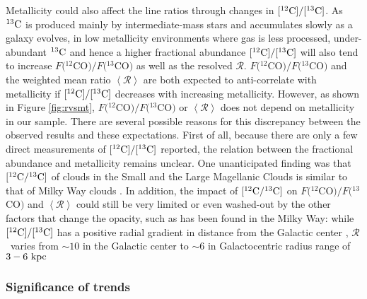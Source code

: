 \documentclass{emulateapj}
\def\ttco{\mbox{$^{13}$CO}}
\def\twco{\mbox{$^{12}$CO}}
\def\rtt{$\mathcal{R}$}
\begin{document}
Metallicity could also affect the line ratios through changes in $[^{12}\rm C]/[^{13}\rm C]$. 
As $^{13}\rm C$ is produced mainly by intermediate-mass stars 
and  accumulates slowly as a galaxy evolves, 
in low metallicity environments where gas is less processed,     
under-abundant $^{13}\rm C$ and hence a higher fractional abundance
$[^{12}\rm C]/[^{13}\rm C]$ will also tend to increase $F($\twco$)/F($\ttco$)$ 
as well as the resolved \rtt. 
$F($\twco$)/F($\ttco$)$  and the weighted mean ratio $\left<\mathcal{R}\right>$ are 
both expected to anti-correlate with metallicity 
if $[^{12}\rm C]/[^{13}\rm C]$ decreases with increasing metallicity. 
However, as shown in Figure \ref{fig:rvsmt}, 
$F($\twco$)/F($\ttco$)$ or $\left<\mathcal{R}\right>$ does not depend on metallicity in our sample. 
There are several possible reasons for this discrepancy between the
observed results and these expectations.
First of all, because there are only a few direct measurements
of $[^{12}\rm C]/[^{13}\rm C]$ reported,
the relation between the fractional abundance and metallicity remains unclear. 
One unanticipated finding was that $[^{12}\rm C/^{13}\rm C]$ of  
clouds in the Small and the Large Magellanic Clouds is 
similar to that of Milky Way clouds \citep{Heikkila1999}.
In addition, the impact of $[^{12}\rm C/^{13}\rm C]$ on  $F($\twco$)/F($\ttco$)$ and $\left<\mathcal{R}\right>$ 
could still be very limited or even washed-out by the other factors
that change the opacity, such as has been found in the Milky Way: 
while $[^{12}\rm C]/[^{13}\rm C]$ has a positive radial gradient in distance from the Galactic center \citep{Milam2005}, \rtt \ varies from $\sim 10$ in the Galactic center \citep{Bally1987,Martin2004} to $\sim 6$ in Galactocentric radius range of $3-6 \rm \ kpc$ \citep{Roman-Duval2016}
 

\subsubsection{Significance of trends}

\begin{figure*}
\caption{
\textit{Left}: Flux ratio $F($\twco$)/F($\ttco$)$ 
as a function of stellar mass of the galaxy. 
The vertical error bars 
show the uncertainty in the flux ratio. 
\textit{Right}: \ttco \ intensity weighted mean ratio 
$\left<\mathcal{R}\right>$ as a function of 
stellar mass. The vertical error bars 
show the intensity weighted standard deviation of \rtt.
}
\label{fig:rvsms}
\end{figure*}
\end{document}
